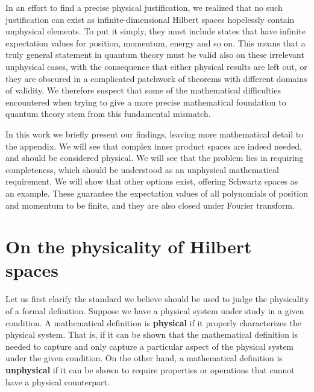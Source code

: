 \documentclass[10pt,twocolumn, nofootinbib]{revtex4-2}
\begin{document}
In an effort to find a precise physical justification, we realized that no such justification can exist as infinite-dimensional Hilbert spaces hopelessly contain unphysical elements. To put it simply, they must include states that have infinite expectation values for position, momentum, energy and so on. This means that a truly general statement in quantum theory must be valid also on these irrelevant unphysical cases, with the consequence that either physical results are left out, or they are obscured in a complicated patchwork of theorems with different domains of validity. We therefore suspect that some of the mathematical difficulties encountered when trying to give a more precise mathematical foundation to quantum theory stem from this fundamental mismatch.

In this work we briefly present our findings, leaving more mathematical detail to the appendix. We will see that complex inner product spaces are indeed needed, and should be considered physical. We will see that the problem lies in requiring completeness, which should be understood as an unphysical mathematical requirement. We will show that other options exist, offering Schwartz spaces as an example. These guarantee the expectation values of all polynomials of position and momentum to be finite, and they are also closed under Fourier transform.

\section{On the physicality of Hilbert spaces}

Let us first clarify the standard we believe should be used to judge the physicality of a formal definition.\cite{redei_tension_2020, north_physics_2021} Suppose we have a physical system under study in a given condition. A mathematical definition is \textbf{physical} if it properly characterizes the physical system. That is, if it can be shown that the mathematical definition is needed to capture and only capture a particular aspect of the physical system under the given condition. On the other hand, a mathematical definition is \textbf{unphysical} if it can be shown to require properties or operations that cannot have a physical counterpart.
\end{document}
